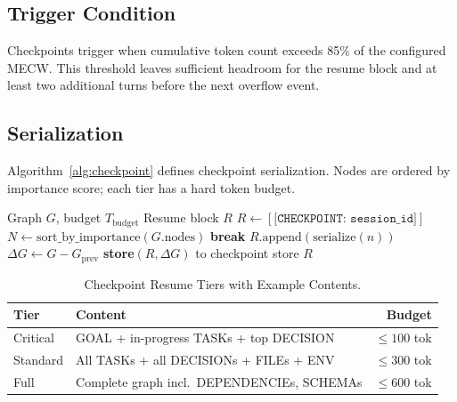 \documentclass[journal]{IEEEtran}
\begin{document}
\subsection{Trigger Condition}

Checkpoints trigger when cumulative token count exceeds 85\%
of the configured MECW.
This threshold leaves sufficient headroom for the resume
block and at least two additional turns before the next
overflow event.

\subsection{Serialization}

Algorithm~\ref{alg:checkpoint} defines checkpoint
serialization. Nodes are ordered by importance score;
each tier has a hard token budget.

\begin{algorithm}[t]
\caption{Checkpoint Serialization}
\label{alg:checkpoint}
\begin{algorithmic}[1]
\REQUIRE Graph $G$, budget $T_\mathrm{budget}$
\ENSURE Resume block $R$
\STATE $R \leftarrow [\texttt{[CHECKPOINT: session\_id]}]$
\STATE $N \leftarrow \mathrm{sort\_by\_importance}(G.\mathrm{nodes})$
    \STATE \textbf{break}
  \ENDIF
  \STATE $R.\mathrm{append}(\mathrm{serialize}(n))$
\ENDFOR
\STATE $\Delta G \leftarrow G - G_\mathrm{prev}$
\STATE \textbf{store}$(R, \Delta G)$ to checkpoint store
\RETURN $R$
\end{algorithmic}
\end{algorithm}

\begin{table}[t]
  \centering
  \caption{Checkpoint Resume Tiers with Example Contents.}
  \label{tab:tiers}
  \renewcommand{\arraystretch}{1.2}
  \begin{tabular}{@{}p{1.3cm}p{4.8cm}r@{}}
    \toprule
    \textbf{Tier} & \textbf{Content} & \textbf{Budget} \\
    \midrule
    Critical & GOAL + in-progress TASKs + top DECISION
              & $\leq 100$ tok \\
    Standard & All TASKs + all DECISIONs + FILEs + ENV
              & $\leq 300$ tok \\
    Full     & Complete graph incl.\ DEPENDENCIEs, SCHEMAs
              & $\leq 600$ tok \\
    \bottomrule
  \end{tabular}
\end{table}
\end{document}
